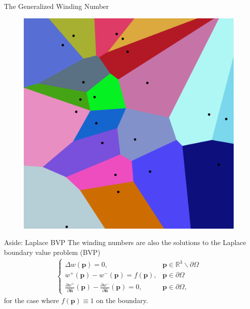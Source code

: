\documentclass[10pt]{beamer}
\newcommand{\bp}{\mathbf{p}}
\newcommand{\bn}{\mathbf{n}}
\begin{document}
\begin{frame}{The \alert{Generalized} Winding Number}
    \begin{figure}
        \centering
        \includegraphics[width=0.5\linewidth]{figures/wn/voronoi.png}
    \end{figure}
\end{frame}

\begin{frame}{\alert{Aside}: Laplace BVP}
    The winding numbers are also the solutions to the Laplace boundary value problem (BVP)
    \begin{align*}
        \begin{cases}
            \Delta w(\bp) = 0,                                                                                       & \bp \in {\mathbb R}^3 \backslash \partial \Omega \\
            w^+(\bp) - w^-(\bp) = f(\bp),                                                                            & \bp \in \partial \Omega                          \\
            \frac{\partial w^+}{\partial \widehat{\bn}}(\bp) - \frac{\partial w^-}{\partial \widehat{\bn}}(\bp) = 0, & \bp \in  \partial \Omega,
        \end{cases}
    \end{align*}
    for the case where \(f(\bp) \equiv 1\) on the boundary.
\end{frame}
\end{document}
